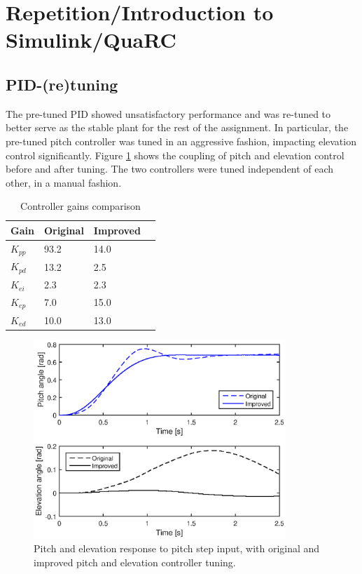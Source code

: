 \section{Repetition/Introduction to Simulink/QuaRC}\label{sec:prob1}
\label{text:problem1}

\subsection{PID-(re)tuning}
The pre-tuned PID showed unsatisfactory performance and was re-tuned to better serve as the stable plant for the rest of the assignment. In particular, the pre-tuned pitch controller was tuned in an aggressive fashion, impacting elevation control significantly. Figure \ref{fig:pid_tuning} shows the coupling of pitch and elevation control before and after tuning. The two controllers were tuned independent of each other, in a manual fashion.

\begin{table}[hp]
	\centering
	\caption{Controller gains comparison}
	\begin{tabular}{llll}
		\hline
		Gain & Original & Improved \\
		\hline
		$K_{pp}$ & 93.2 & 14.0 \\
		$K_{pd}$ & 13.2 & 2.5 \\
		$K_{ei}$ & 2.3 & 2.3 \\
		$K_{ep}$ & 7.0 & 15.0 \\
		$K_{ed}$ & 10.0 & 13.0 \\
	\end{tabular}
	\label{tab:gains}
\end{table}

\begin{figure}[hp]
	\centering
		\includegraphics[width=0.85\textwidth]{figures/1/pid_tuning.eps}
	\caption{Pitch and elevation response to pitch step input, with original and improved pitch and elevation controller tuning.}
	\label{fig:pid_tuning}
\end{figure}


